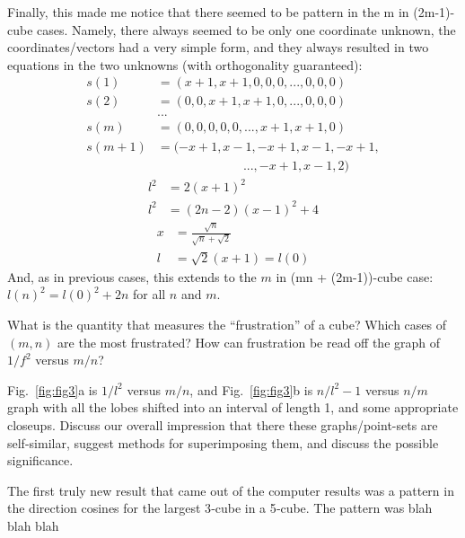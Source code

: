 \documentclass[superscriptaddress,reprint,amsmath,amssymb,aps]{revtex4-1}
\begin{document}
Finally, this made me notice that there seemed to be pattern in the m in
(2m-1)-cube cases.  Namely, there always seemed to be only one
coordinate unknown, the coordinates/vectors had a very simple form, and
they always resulted in two equations in the two unknowns (with
orthogonality guaranteed):
\begin{align*}
     s(1)   & = ( x+1, x+1,    0,   0,    0, ...,    0,   0, 0) \\
     s(2)   & = (   0,   0,  x+1, x+1,    0, ...,    0,   0, 0) \\
            & ...                                               \\
     s(m)   & = (   0,   0,    0,   0,    0, ...,  x+1, x+1, 0) \\
     s(m+1) & = (-x+1, x-1, -x+1, x-1, -x+1,                    \\
            & ~~~~~~~~~~~~~~~~~~~~~~~~~~~~~~~..., -x+1, x-1, 2)
\end{align*}
\begin{align*}
     l^2 & =     2 (x+1)^2     \\
     l^2 & = (2n-2)(x-1)^2 + 4
\end{align*}
\begin{align*}
     x & = \frac{\sqrt{n}}{\sqrt{n}+\sqrt{2}} \\
     l & = \sqrt{2}(x+1) = l(0)
\end{align*}
And, as in previous cases, this extends to the $m$ in (mn + (2m-1))-cube
case:  $l(n)^2 = l(0)^2 + 2n$ for all $n$ and $m$.

What is the quantity that measures the ``frustration'' of a cube?  Which
cases of $(m,n)$ are the most frustrated?  How can frustration be read off
the graph of $1/f^2$ versus $m/n$?

Fig.~\ref{fig:fig3}a is $1/l^2$ versus $m/n$, and Fig.~\ref{fig:fig3}b is $n/l^2-1$ versus $n/m$
graph with all the lobes shifted into an interval of length 1, and some
appropriate closeups.  Discuss our overall impression that there these
graphs/point-sets are self-similar, suggest methods for superimposing them,
and discuss the possible significance.


The first truly new result that came out of the computer results was a
pattern in the direction cosines for the largest 3‐cube in a 5‐cube.  The
pattern was blah blah blah
\end{document}
